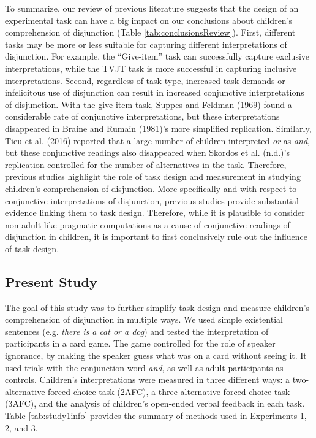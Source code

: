 \documentclass[,man,floatsintext]{apa6}
\begin{document}
To summarize, our review of previous literature suggests that the design of an experimental task can have a big impact on our conclusions about children's comprehension of disjunction (Table \ref{tab:conclusionsReview}). First, different tasks may be more or less suitable for capturing different interpretations of disjunction. For example, the \enquote{Give-item} task can successfully capture exclusive interpretations, while the TVJT task is more successful in capturing inclusive interpretations. Second, regardless of task type, increased task demands or infelicitous use of disjunction can result in increased conjunctive interpretations of disjunction. With the give-item task, Suppes and Feldman (1969) found a considerable rate of conjunctive interpretations, but these interpretations disappeared in Braine and Rumain (1981)'s more simplified replication. Similarly, Tieu et al. (2016) reported that a large number of children interpreted \emph{or} as \emph{and}, but these conjunctive readings also disappeared when Skordos et al. (n.d.)'s replication controlled for the number of alternatives in the task. Therefore, previous studies highlight the role of task design and measurement in studying children's comprehension of disjunction. More specifically and with respect to conjunctive interpretations of disjunction, previous studies provide substantial evidence linking them to task design. Therefore, while it is plausible to consider non-adult-like pragmatic computations as a cause of conjunctive readings of disjunction in children, it is important to first conclusively rule out the influence of task design.

\hypertarget{present-study}{%
\subsection{Present Study}\label{present-study}}

The goal of this study was to further simplify task design and measure children's comprehension of disjunction in multiple ways. We used simple existential sentences (e.g. \emph{there is a cat or a dog}) and tested the interpretation of participants in a card game. The game controlled for the role of speaker ignorance, by making the speaker guess what was on a card without seeing it. It used trials with the conjunction word \emph{and}, as well as adult participants as controls. Children's interpretations were measured in three different ways: a two-alternative forced choice task (2AFC), a three-alternative forced choice task (3AFC), and the analysis of children's open-ended verbal feedback in each task. Table \ref{tab:study1info} provides the summary of methods used in Experiments 1, 2, and 3.
\end{document}
